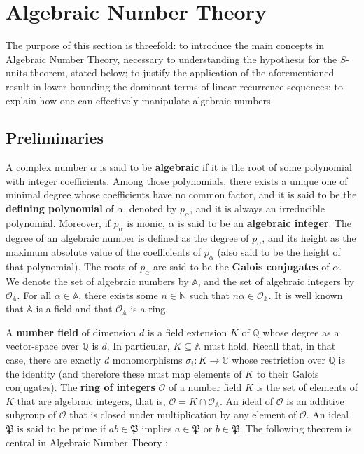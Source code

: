 
\section{Algebraic Number Theory}

The purpose of this section is threefold: to introduce the main concepts in Algebraic Number Theory, necessary to understanding the hypothesis for the $S$-units theorem, stated below; to justify the application of the aforementioned result in lower-bounding the dominant terms of linear recurrence sequences; to explain how one can effectively manipulate algebraic numbers.

\subsection{Preliminaries}

A complex number $\alpha$ is said to be \textbf{algebraic} if it is the root of some polynomial with integer coefficients. Among those polynomials, there exists a unique one of minimal degree whose coefficients have no common factor, and it is said to be the \textbf{defining polynomial} of $\alpha$, denoted by $p_\alpha$, and it is always an irreducible polynomial. Moreover, if $p_\alpha$ is monic, $\alpha$ is said to be an \textbf{algebraic integer}. The degree of an algebraic number is defined as the degree of $p_\alpha$, and its height as the maximum absolute value of the coefficients of $p_\alpha$ (also said to be the height of that polynomial). The roots of $p_\alpha$ are said to be the \textbf{Galois conjugates} of $\alpha$. We denote the set of algebraic numbers by $\mathbb{A}$, and the set of algebraic integers by $\mathcal{O}_\mathbb{A}$. For all $\alpha\in\mathbb{A}$, there exists some $n\in\mathbb{N}$ such that $n\alpha\in\mathcal{O}_\mathbb{A}$. It is well known that $\mathbb{A}$ is a field and that $\mathcal{O}_\mathbb{A}$ is a ring.

A \textbf{number field} of dimension $d$ is a field extension $K$ of $\mathbb{Q}$ whose degree as a vector-space over $\mathbb{Q}$ is $d$. In particular, $K\subseteq\mathbb{A}$ must hold. Recall that, in that case, there are exactly $d$ monomorphisms $\sigma_i:K\rightarrow\mathbb{C}$ whose restriction over $\mathbb{Q}$ is the identity (and therefore these must map elements of $K$ to their Galois conjugates). The \textbf{ring of integers} $\mathcal{O}$ of a number field $K$ is the set of elements of $K$ that are algebraic integers, that is, $\mathcal{O}=K\cap\mathcal{O}_\mathbb{A}$. An ideal of $\mathcal{O}$ is an additive subgroup of $\mathcal{O}$ that is closed under multiplication by any element of $\mathcal{O}$. An ideal $\mathfrak{P}$ is said to be prime if $ab\in \mathfrak{P}$ implies $a\in\mathfrak{P}$ or $b\in\mathfrak{P}$. The following theorem is central in Algebraic Number Theory \cite{SnT}:

